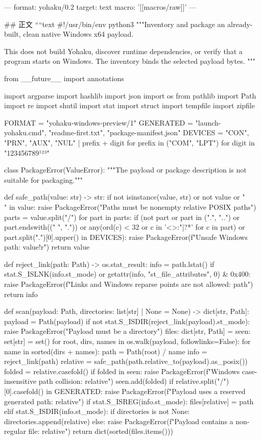---
format: yohaku/0.2
target: text
macro: '[[macros/raw]]'
---

## 正文
````text
#!/usr/bin/env python3
"""Inventory and package an already-built, clean native Windows x64 payload.

This does not build Yohaku, discover runtime dependencies, or verify that a
program starts on Windows. The inventory binds the selected payload bytes.
"""

from __future__ import annotations

import argparse
import hashlib
import json
import os
from pathlib import Path
import re
import shutil
import stat
import struct
import tempfile
import zipfile


FORMAT = "yohaku-windows-preview/1"
GENERATED = {"launch-yohaku.cmd", "readme-first.txt", "package-manifest.json"}
DEVICES = {"CON", "PRN", "AUX", "NUL"} | {
    prefix + digit for prefix in ("COM", "LPT") for digit in "123456789¹²³"
}


class PackageError(ValueError):
    """The payload or package description is not suitable for packaging."""


def safe_path(value: str) -> str:
    if not isinstance(value, str) or not value or "\\" in value:
        raise PackageError("Paths must be nonempty relative POSIX paths")
    parts = value.split("/")
    for part in parts:
        if (not part or part in (".", "..") or part.endswith((" ", "."))
                or any(ord(c) < 32 or c in '<>:"|?*' for c in part)
                or part.split(".")[0].upper() in DEVICES):
            raise PackageError(f"Unsafe Windows path: {value!r}")
    return value


def reject_link(path: Path) -> os.stat_result:
    info = path.lstat()
    if stat.S_ISLNK(info.st_mode) or getattr(info, "st_file_attributes", 0) & 0x400:
        raise PackageError(f"Links and Windows reparse points are not allowed: {path}")
    return info


def scan(payload: Path, directories: list[str] | None = None) -> dict[str, Path]:
    payload = Path(payload)
    if not stat.S_ISDIR(reject_link(payload).st_mode):
        raise PackageError("Payload must be a directory")
    files: dict[str, Path] = {}
    seen: set[str] = set()
    for root, dirs, names in os.walk(payload, followlinks=False):
        for name in sorted(dirs + names):
            path = Path(root) / name
            info = reject_link(path)
            relative = safe_path(path.relative_to(payload).as_posix())
            folded = relative.casefold()
            if folded in seen:
                raise PackageError(f"Windows case-insensitive path collision: {relative}")
            seen.add(folded)
            if relative.split("/")[0].casefold() in GENERATED:
                raise PackageError(f"Payload uses a reserved generated path: {relative}")
            if stat.S_ISREG(info.st_mode):
                files[relative] = path
            elif stat.S_ISDIR(info.st_mode):
                if directories is not None:
                    directories.append(relative)
            else:
                raise PackageError(f"Payload contains a non-regular file: {relative}")
    return dict(sorted(files.items()))


